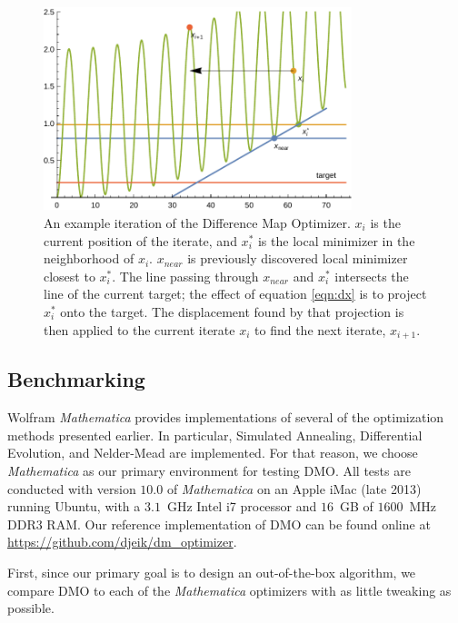 \documentclass[12pt]{article}
\begin{document}
\begin{figure}[H]
    \begin{center}
        \includegraphics[width=0.8\textwidth]{../figures/iterating.pdf}
        \caption{
            An example iteration of the Difference Map Optimizer.
            $x_i$ is the current position of the iterate, and $x_i^*$ is the
            local minimizer in the neighborhood of $x_i$. $x_{near}$ is
            previously discovered local minimizer closest to $x_i^*$.
            The line passing through $x_{near}$ and $x_i^*$ intersects the
            line of the current target; the effect of equation \ref{eqn:dx}
            is to project $x_i^*$ onto the target. The displacement found by
            that projection is then applied to the current iterate $x_i$ to
            find the next iterate, $x_{i+1}$.
        }
        \label{fig:iteration}
    \end{center}
\end{figure}


\subsection{Benchmarking}

Wolfram \emph{Mathematica} provides implementations of several of the
optimization methods presented earlier.
In particular, Simulated Annealing, Differential Evolution, and Nelder-Mead
are implemented.
For that reason, we choose \emph{Mathematica} as our primary environment for
testing DMO.
All tests are conducted with version $10.0$ of \emph{Mathematica} on an
Apple iMac (late 2013) running Ubuntu, with a $3.1$~GHz Intel i7 processor
and $16$~GB of $1600$~MHz DDR3 RAM.
Our reference implementation of DMO can be found online at
\url{https://github.com/djeik/dm_optimizer}.

First, since our primary goal is to design an out-of-the-box algorithm,
we compare DMO to each of the \emph{Mathematica} optimizers with as little
tweaking as possible.
\end{document}
